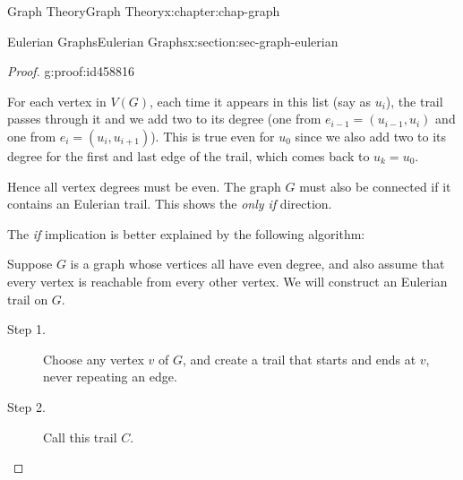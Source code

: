 \documentclass[oneside,10pt,]{book}
\numberwithin{equation}{section}
\begin{document}
\begin{chapterptx}{Graph Theory}{}{Graph Theory}{}{}{x:chapter:chap-graph}
\begin{sectionptx}{Eulerian Graphs}{}{Eulerian Graphs}{}{}{x:section:sec-graph-eulerian}
\begin{proof}{}{g:proof:id458816}
\begin{sidebyside}{1}{0.275}{0.275}{0}
\begin{sbspanel}{0.45}
{
}%
\end{sbspanel}%
\end{sidebyside}%
\par
For each vertex in \(V(G)\), each time it appears in this list (say as \(u_i\)), the trail passes through it and we add two to its degree (one from \(e_{i-1} = (u_{i-1},u_i)\) and one from \(e_i = (u_i,u_{i+1})\)). This is true even for \(u_0\) since we also add two to its degree for the first and last edge of the trail, which comes back to \(u_k = u_0\).%
\par
Hence all vertex degrees must be even. The graph \(G\) must also be connected if it contains an Eulerian trail. This shows the \emph{only if} direction.%
\par
The \emph{if} implication is better explained by the following algorithm:%
\par
Suppose \(G\) is a graph whose vertices all have even degree, and also assume that every vertex is reachable from every other vertex. We will construct an Eulerian trail on \(G\).%
\par
%
\begin{description}
\item[{Step 1.}]Choose any vertex \(v\) of \(G\), and create a trail that starts and ends at \(v\), never repeating an edge.%
\item[{Step 2.}]Call this trail \(C\).%

\end{description}
\end{proof}
\end{sectionptx}
\end{chapterptx}
\end{document}
